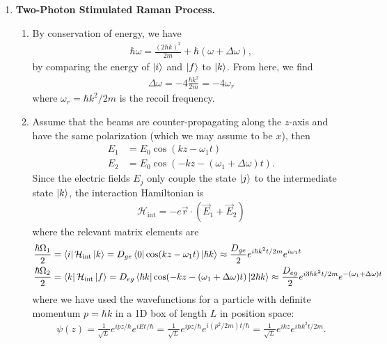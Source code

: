 \documentclass{article}
\theoremstyle{definition}
\newcommand{\f}[2]{\frac{#1}{#2}}
\begin{document}
\begin{enumerate}
	\item \textbf{Two-Photon Stimulated Raman Process.} 
	\begin{enumerate}[label=(\alph*)]
		\item By conservation of energy, we have
		\begin{align*}
		\hbar \omega = \f{(2\hbar k)^2}{2m} + \hbar (\omega + \Delta \omega),
		\end{align*}
		by comparing the energy of $\ket{i}$ and $\ket{f}$ to $\ket{k}$. From here, we find 
		\begin{align*}
		\Delta \omega = -4 \f{\hbar k^2}{2m}=  - 4\omega_r
		\end{align*}
		where $\omega_r = \hbar k^2/2m$ is the recoil frequency. 
		
		\item Assume that the beams are counter-propagating along the $z$-axis and have the same polarization (which we may assume to be $x$), then
		\begin{align*}
		E_1 &= E_0 \cos(kz - \omega_1 t) \\
		E_2 &= E_0 \cos(-kz - (\omega_1 + \Delta \omega) t). 
		\end{align*}
		Since the electric fields $E_j$ only couple the state $\ket{j}$ to the intermediate state $\ket{k}$, the interaction Hamiltonian is 
		\begin{align*}
		\mathcal{H}_\text{int} = -e\vec{r}\cdot (\vec{E}_1 + \vec{E}_2)
		\end{align*}
		where the relevant matrix elements are
		\begin{align*}
		\f{\hbar \Omega_1}{2} &= \bra{i} \mathcal{H}_\text{int} \ket{k} = D_{ge} \bra{0} \cos(kz - \omega_1 t) \ket{\hbar k} \approx \f{D_{ge}}{2} e^{i\hbar k^2 t / 2m} e^{i\omega_1 t}    \\
		\f{\hbar \Omega_2}{2} &= \bra{k} \mathcal{H}_\text{int} \ket{f} = D_{eg} \bra{\hbar k} \cos(-kz - (\omega_1 + \Delta \omega) t) \ket{2\hbar k} \approx \f{D_{eg}}{2}e^{i 3 \hbar k^2 t /2m} e^{-(\omega_1 + \Delta \omega)t}
		\end{align*}
		where we have used the wavefunctions for a particle with definite momentum $p  = \hbar k$ in a 1D box of length $L$ in position space: 
		\begin{align*}
		\psi(z) = \f{1}{\sqrt{L}}e^{i pz/\hbar} e^{iEt/\hbar} = \f{1}{\sqrt{L}}e^{i pz/\hbar} e^{i(p^2/2m)t/\hbar} = \f{1}{\sqrt{L}}e^{ikz} e^{i\hbar k^2 t/2m}.
		\end{align*}
		

\end{enumerate}
\end{enumerate}
\end{document}
